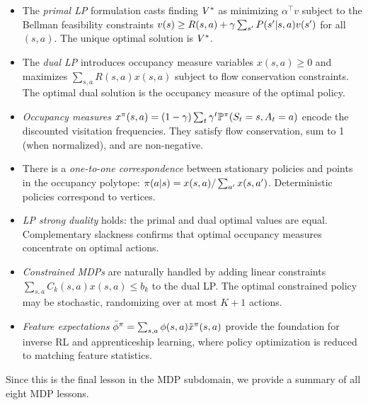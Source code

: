\documentclass[11pt,a4paper]{article}
\begin{document}
\begin{itemize}
    \item The \emph{primal LP} formulation casts finding $V^*$ as
    minimizing $\alpha^\top v$ subject to the Bellman feasibility
    constraints $v(s) \geq R(s,a) + \gamma \sum_{s'} P(s'|s,a)
    v(s')$ for all $(s,a)$. The unique optimal solution is $V^*$.
    \item The \emph{dual LP} introduces occupancy measure variables
    $x(s,a) \geq 0$ and maximizes $\sum_{s,a} R(s,a) x(s,a)$
    subject to flow conservation constraints. The optimal dual
    solution is the occupancy measure of the optimal policy.
    \item \emph{Occupancy measures}
    $x^\pi(s,a) = (1-\gamma) \sum_t \gamma^t
    \mathbb{P}^\pi(S_t = s, A_t = a)$ encode the discounted
    visitation frequencies. They satisfy flow conservation, sum to
    1 (when normalized), and are non-negative.
    \item There is a \emph{one-to-one correspondence} between
    stationary policies and points in the occupancy polytope:
    $\pi(a|s) = x(s,a) / \sum_{a'} x(s,a')$.
    Deterministic policies correspond to vertices.
    \item \emph{LP strong duality} holds: the primal and dual
    optimal values are equal. Complementary slackness confirms that
    optimal occupancy measures concentrate on optimal actions.
    \item \emph{Constrained MDPs} are naturally handled by adding
    linear constraints $\sum_{s,a} C_k(s,a) x(s,a) \leq b_k$ to
    the dual LP. The optimal constrained policy may be stochastic,
    randomizing over at most $K + 1$ actions.
    \item \emph{Feature expectations} $\bar{\phi}^\pi =
    \sum_{s,a} \phi(s,a) \tilde{x}^\pi(s,a)$ provide the
    foundation for inverse RL and apprenticeship learning, where
    policy optimization is reduced to matching feature statistics.
\end{itemize}

Since this is the final lesson in the MDP subdomain, we provide a
summary of all eight MDP lessons.
\end{document}
